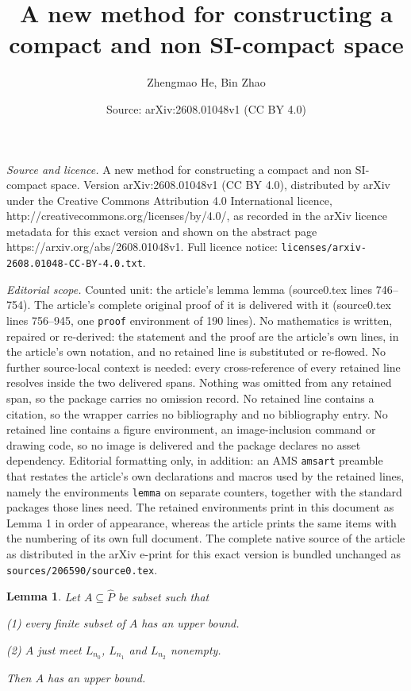 \documentclass[10pt,a4paper]{amsart}
\title{A new method for constructing a compact and non SI-compact space}
\author{Zhengmao He, Bin Zhao}
\date{Source: arXiv:2608.01048v1 (CC BY 4.0)}
\newtheorem{lemma}{Lemma}
\begin{document}
\maketitle

\noindent\emph{Source and licence.} A new method for constructing a compact and non SI-compact space. Version arXiv:2608.01048v1 (CC BY 4.0), distributed by arXiv under the Creative Commons Attribution 4.0 International licence, http://creativecommons.org/licenses/by/4.0/, as recorded in the arXiv licence metadata for this exact version and shown on the abstract page https://arxiv.org/abs/2608.01048v1. Full licence notice: \texttt{licenses/arxiv-2608.01048-CC-BY-4.0.txt}.\par\smallskip

\noindent\textit{Editorial scope.} Counted unit: the article's lemma lemma (source0.tex lines 746--754). The article's complete original proof of it is delivered with it (source0.tex lines 756--945, one \texttt{proof} environment of 190 lines). No mathematics is written, repaired or re-derived: the statement and the proof are the article's own lines, in the article's own notation, and no retained line is substituted or re-flowed.  No further source-local context is needed: every cross-reference of every retained line resolves inside the two delivered spans.  Nothing was omitted from any retained span, so the package carries no omission record.  No retained line contains a citation, so the wrapper carries no bibliography and no bibliography entry.  No retained line contains a figure environment, an image-inclusion command or drawing code, so no image is delivered and the package declares no asset dependency.  Editorial formatting only, in addition: an AMS \texttt{amsart} preamble that restates the article's own declarations and macros used by the retained lines, namely the environments \texttt{lemma} on separate counters, together with the standard packages those lines need.  The retained environments print in this document as Lemma 1 in order of appearance, whereas the article prints the same items with the numbering of its own full document.  The complete native source of the article as distributed in the arXiv e-print for this exact version is bundled unchanged as \texttt{sources/206590/source0.tex}.
\begin{lemma} {\rm Let $A\subseteq\widehat{P}$ be subset such that

(1) every finite subset of $A$ has an upper bound.

(2) $A$ just meet $L_{n_{0}}$, $L_{n_{1}}$ and  $L_{n_{2}}$ nonempty.

Then $A$ has an upper bound.}

\end{lemma}
\end{document}
